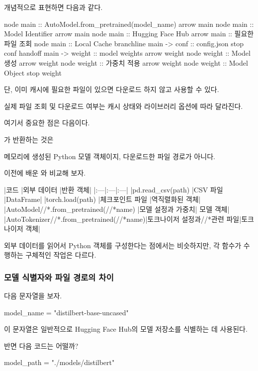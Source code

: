 개념적으로 표현하면 다음과 같다.

\begin{dhkbranch}[in=8]
node main :: AutoModel.from_pretrained(model_name)
arrow main
node main :: Model Identifier
arrow main
node main :: Hugging Face Hub
arrow main :: 필요한 파일 조회
node main :: Local Cache
branchline main -> conf :: config.json
stop conf
handoff main -> weight :: model weights
arrow weight
node weight :: Model 생성
arrow weight
node weight :: 가중치 적용
arrow weight
node weight :: Model Object
stop weight
\end{dhkbranch}

단, 이미 캐시에 필요한 파일이 있으면 다운로드 하지 않고 사용할 수 있다.

실제 파일 조회 및 다운로드 여부는 캐시 상태와 라이브러리 옵션에 따라 달라진다.

여기서 중요한 점은 다음이다.

가 반환하는 것은

메모리에 생성된 Python 모델 객체이지, 다운로드한 파일 경로가 아니다.

이전에 배운 와 비교해 보자.

\begin{dhktable}
|코드	|외부 데이터	|반환 객체|
|:---|:---|:---|
|pd.read_csv(path)	|CSV 파일	|DataFrame|
|torch.load(path)	|체크포인트 파일	|역직렬화된 객체|
|AutoModel//*.from_pretrained(//*name)	|모델 설정과 가중치|	모델 객체|
|AutoTokenizer//*.from_pretrained(//*name)|토크나이저 설정과//*관련 파일|토크나이저 객체|
\end{dhktable}

외부 데이터를 읽어서 Python 객체를 구성한다는 점에서는 비슷하지만, 각 함수가 수행하는 구체적인 작업은 다르다.

\subsubsection{모델 식별자와 파일 경로의 차이}

다음 문자열을 보자.

\begin{dhkcode}
model_name = "distilbert-base-uncased"
\end{dhkcode}

이 문자열은 일반적으로 Hugging Face Hub의 모델 저장소를 식별하는 데 사용된다.

반면 다음 코드는 어떨까?

\begin{dhkcode}
model_path = "./models/distilbert"
\end{dhkcode}

